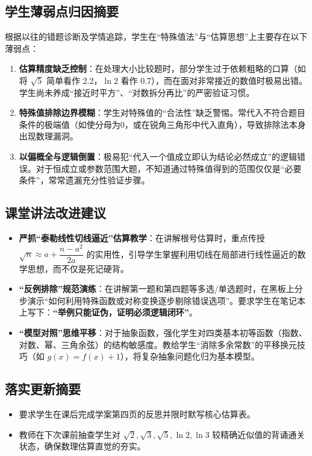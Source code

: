 \documentclass[11pt,a4paper]{ctexart}
\begin{document}
\subsection{学生薄弱点归因摘要}
根据以往的错题诊断及学情追踪，学生在“特殊值法”与“估算思想”上主要存在以下薄弱点：
\begin{enumerate}[label=\arabic*. , leftmargin=2em, itemsep=0.1em, topsep=0.2em]
  \item \textbf{估算精度缺乏控制}：在处理大小比较题时，部分学生过于依赖粗略的口算（如将 \(\sqrt{5}\) 简单看作 2.2，\(\ln 2\) 看作 0.7），而在面对非常接近的数值时极易出错。学生尚未养成“接近时平方”、“对数拆分再比”的严密验证习惯。
  \item \textbf{特殊值排除边界模糊}：学生对特殊值的“合法性”缺乏警惕。常代入不符合题目条件的极端值（如使分母为0，或在锐角三角形中代入直角），导致排除法本身出现数理漏洞。
  \item \textbf{以偏概全与逻辑倒置}：极易犯“代入一个值成立即认为结论必然成立”的逻辑错误。对于恒成立或参数范围大题，不知道通过特殊值得到的范围仅仅是“必要条件”，常常遗漏充分性验证步骤。
\end{enumerate}

\subsection{课堂讲法改进建议}
\begin{itemize}[leftmargin=2em, itemsep=0.1em, topsep=0.2em]
  \item \textbf{严抓“泰勒线性切线逼近”估算教学}：在讲解根号估算时，重点传授 \(\sqrt{n} \approx a + \dfrac{n-a^2}{2a}\) 的实用性，引导学生掌握利用切线在局部进行线性逼近的数学思想，而不仅是死记硬背。
  \item \textbf{“反例排除”规范演练}：在讲解第一题和第四题等多选/单选题时，在黑板上分步演示“如何利用特殊函数或对称变换逐步剔除错误选项”。要求学生在笔记本上写下：\textbf{“举例只能证伪，证明必须逻辑闭环”}。
  \item \textbf{“模型对照”思维平移}：对于抽象函数，强化学生对四类基本初等函数（指数、对数、幂、三角余弦）的结构敏感度。教给学生“消除多余常数”的平移换元技巧（如 \(g(x)=f(x)+1\)），将复杂抽象问题化归为基本模型。
\end{itemize}

\subsection{落实更新摘要}
\begin{itemize}[leftmargin=2em, itemsep=0.1em, topsep=0.2em]
  \item 要求学生在课后完成学案第四页的反思并限时默写核心估算表。
  \item 教师在下次课前抽查学生对 \(\sqrt{2},\sqrt{3},\sqrt{5},\ln 2,\ln 3\) 较精确近似值的背诵通关状态，确保数理估算直觉的夯实。
\end{itemize}
\end{document}
